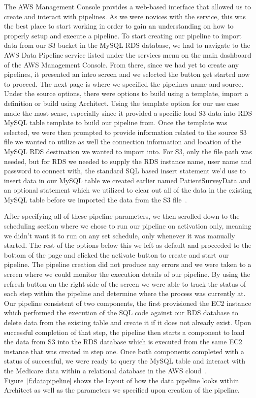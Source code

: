 The AWS Management Console provides a web-based interface that allowed us to 
create and interact with pipelines. As we were novices with the service, 
this was the best place to start working in order to gain an understanding on 
how to properly setup and execute a pipeline. To start creating our pipeline 
to import data from our S3 bucket in the MySQL RDS database, we had to 
navigate to the AWS Data Pipeline service listed under the services menu on 
the main dashboard of the AWS Management Console. From there, since we had yet 
to create any pipelines, it presented an intro screen and we selected the 
button get started now to proceed. The next page is where we specified the 
pipelines name and source. Under the source options, there were options to 
build using a template, import a definition or build using Architect. Using 
the template option for our use case made the most sense, especially since it 
provided a specific load S3 data into RDS MySQL table template to build our 
pipeline from. Once the template was selected, we were then prompted to 
provide information related to the source S3 file we wanted to utilize as well 
the connection information and location of the MySQL RDS destination we wanted 
to import into. For S3, only the file path was needed, but for RDS we needed 
to supply the RDS instance name, user name and password to connect with, the 
standard SQL based insert statement we'd use to insert data in our MySQL table 
we created earlier named PatientSurveyData and an optional statement which we 
utilized to clear out all of the data in the existing MySQL table before we 
imported the data from the S3 file~\cite{hid-sp18-521-datapipelinestarting}.

After specifying all of these pipeline parameters, we then scrolled down to 
the scheduling section where we chose to run our pipeline on activation only, 
meaning we didn't want it to run on any set schedule, only whenever it was 
manually started. The rest of the options below this we left as default and 
proceeded to the bottom of the page and clicked the activate button to create 
and start our pipeline. The pipeline creation did not produce any errors and 
we were taken to a screen where we could monitor the execution details of our 
pipeline. By using the refresh button on the right side of the screen we were 
able to track the status of each step within the pipeline and determine where 
the process was currently at. Our pipeline consistent of two components, the 
first provisioned the EC2 instance which performed the execution of the SQL 
code against our RDS database to delete data from the existing table and 
create it if it does not already exist. Upon successful completion of that 
step, the pipeline then starts a component to load the data from S3 into the 
RDS database which is executed from the same EC2 instance that was created in 
step one. Once both components completed with a status of successful, we were 
ready to query the MySQL table and interact with the Medicare data within a 
relational database in the AWS cloud~\cite{hid-sp18-521-datapipelinestarting}.
Figure~\ref{f:datapipeline} shows the layout of how the data pipeline looks 
within Architect as well as the parameters we specified upon creation of the 
pipeline.  

